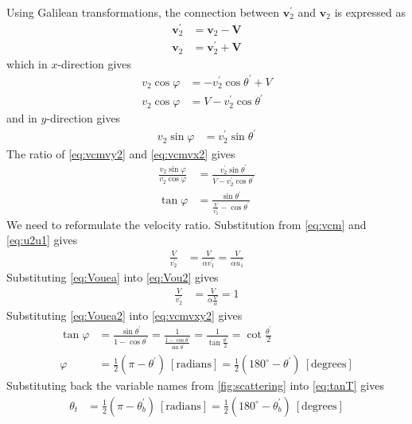 \documentclass[twoside,english]{uiofysmaster/uiofysmaster}
\let\orgautoref\autoref
\renewcommand{\autoref}
        {%
		 \def\sectionautorefname{Section}%
		 \def\subsectionautorefname{Section}%
		 \def\subsubsectionautorefname{Section}%
		 \def\chapterautorefname{Chapter}%
          \orgautoref}
\begin{document}
\begin{appendices}
Using Galilean transformations, the connection between $\boldsymbol{v}_2^{'}$ and $\boldsymbol{v}_2$ is expressed as
\begin{align}\label{eq:vcmv2}
	\boldsymbol{v}_2^{'} &= \boldsymbol{v}_2 - \boldsymbol{V} \nonumber\\
	\boldsymbol{v}_2 &= \boldsymbol{v}_2^{'} + \boldsymbol{V}
\end{align}
which in $x$-direction gives
\begin{align}\label{eq:vcmvx2}
	v_2 \cos \varphi &= -v_2^{'} \cos \theta^{'} + V \nonumber\\
	v_2 \cos \varphi &= V - v_2^{'} \cos \theta^{'}
\end{align}
and in $y$-direction gives
\begin{align}\label{eq:vcmvy2}
	v_2 \sin \varphi &= v_2^{'} \sin \theta^{'}
\end{align}
The ratio of \autoref{eq:vcmvy2} and \autoref{eq:vcmvx2} gives
\begin{align}\label{eq:vcmvxy2}
	\frac{v_2 \sin \varphi}{v_2 \cos \varphi} &= \frac{v_2^{'} \sin \theta^{'}}{V - v_2^{'} \cos \theta^{'}} \nonumber\\
	\tan \varphi &= \frac{\sin \theta^{'}}{\frac{V}{v_2^{'}} - \cos \theta^{'}}
\end{align}
We need to reformulate the velocity ratio. 
Substitution from \autoref{eq:vcm} and \autoref{eq:u2u1} gives
\begin{align}\label{eq:Vou2}
	\frac{V}{v_2^{'}} &= \frac{V}{\alpha v_1^{'}} = \frac{V}{\alpha u_1^{'}}
\end{align}
Substituting \autoref{eq:Vouea} into \autoref{eq:Vou2} gives
\begin{align}\label{eq:Vouea2}
	\frac{V}{v_2^{'}} &= \frac{V}{\alpha \frac{V}{\alpha}} = 1
\end{align}
Substituting \autoref{eq:Vouea2} into \autoref{eq:vcmvxy2} gives
\begin{align}\label{eq:tanT}
	\tan \varphi &= \frac{\sin \theta^{'}}{1 - \cos \theta^{'}} = \frac{1}{\frac{1 - \cos \theta^{'}}{\sin \theta^{'}}} = \frac{1}{\tan \frac{\theta^{'}}{2}} = \cot \frac{\theta^{'}}{2} \nonumber\\
	\varphi &= \tfrac{1}{2} (\pi - \theta^{'}) ~[ \text{radians} ] = \tfrac{1}{2} (180^\circ - \theta^{'}) ~[ \text{degrees} ]
\end{align}
Substituting back the variable names from \autoref{fig:scattering} into \autoref{eq:tanT} gives
\begin{align}\label{eq:tanTgen}
	\theta_t &= \tfrac{1}{2} (\pi - \theta_b^{'}) ~[ \text{radians} ] = \tfrac{1}{2} (180^\circ - \theta_b^{'}) ~[ \text{degrees} ]
\end{align}



\end{appendices}
\end{document}
